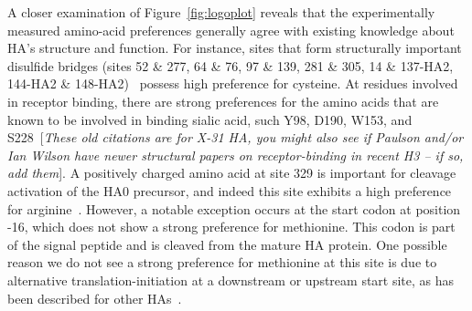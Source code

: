 \documentclass[9pt,twocolumn,twoside]{pnas-new}
\newcommand{\comment}[1]{{\color{red}[\textsl{#1}]}}
\begin{document}
A closer examination of Figure~\ref{fig:logoplot} reveals that the experimentally measured amino-acid preferences generally agree with existing knowledge about HA's structure and function.
For instance, sites that form structurally important disulfide bridges (sites 52 \& 277, 64 \& 76, 97 \& 139, 281 \& 305, 14 \& 137-HA2, 144-HA2 \& 148-HA2)~\cite{waterfield1981disulphide} possess high preference for cysteine.
At residues involved in receptor binding, there are strong preferences for the amino acids that are known to be involved in binding sialic acid, such Y98, D190, W153, and S228~\cite{weis1988structure,martin1998studies,nobusawa2000change}\comment{These old citations are for X-31 HA, you might also see if Paulson and/or Ian Wilson have newer structural papers on receptor-binding in recent H3 -- if so, add them}.
A positively charged amino acid at site 329 is important for cleavage activation of the HA0 precursor, and indeed this site exhibits a high preference for arginine~\cite{kido1992isolation, stech2005new}.
However, a notable exception occurs at the start codon at position -16, which does not show a strong preference for methionine. 
This codon is part of the signal peptide and is cleaved from the mature HA protein.
One possible reason we do not see a strong preference for methionine at this site is due to alternative translation-initiation at a downstream or upstream start site, as has been described for other HAs~\cite{girard2011upstream}.
\end{document}
